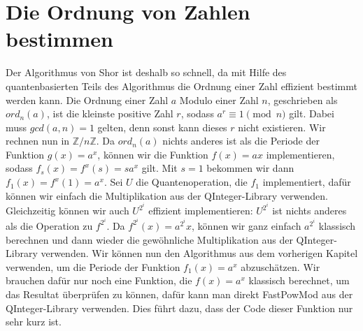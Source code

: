 \section{Die Ordnung von Zahlen bestimmen}
Der Algorithmus von Shor ist deshalb so schnell, da mit Hilfe des quantenbasierten Teils des Algorithmus die Ordnung einer Zahl effizient bestimmt werden kann. Die Ordnung einer Zahl $a$ Modulo einer Zahl $n$, geschrieben als $ord_n(a)$, ist die kleinste positive Zahl $r$, sodass $a^r \equiv 1 \pmod{n}$ gilt. Dabei muss $gcd(a, n) = 1$ gelten, denn sonst kann dieses $r$ nicht existieren. Wir rechnen nun in $\mathbb{Z} / n \mathbb{Z}$. Da $ord_n(a)$ nichts anderes ist als die Periode der Funktion $g(x) = a^x$, können wir die Funktion $f(x) = ax$ implementieren, sodass $f_s(x) = f^x(s) = sa^x$ gilt. Mit $s = 1$ bekommen wir dann $f_1(x) = f^x(1) = a^x$. Sei $U$ die Quantenoperation, die $f_1$ implementiert, dafür können wir einfach die Multiplikation aus der QInteger-Library verwenden. Gleichzeitig können wir auch $U^{2^i}$ effizient implementieren: $U^{2^i}$ ist nichts anderes als die Operation zu $f^{2^i}$. Da $f^{2^i}(x) = a^{2^i}x$, können wir ganz einfach $a^{2^i}$ klassisch berechnen und dann wieder die gewöhnliche Multiplikation aus der QInteger-Library verwenden. Wir können nun den Algorithmus aus dem vorherigen Kapitel verwenden, um die Periode der Funktion $f_1(x) = a^x$ abzuschätzen. Wir brauchen dafür nur noch eine Funktion, die $f(x) = a^x$ klassisch berechnet, um das Resultat überprüfen zu können, dafür kann man direkt FastPowMod aus der QInteger-Library verwenden. Dies führt dazu, dass der Code dieser Funktion nur sehr kurz ist.

